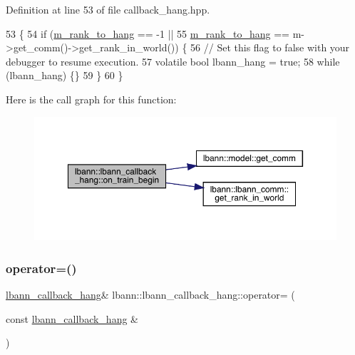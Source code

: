 Definition at line 53 of file callback\+\_\+hang.\+hpp.


\begin{DoxyCode}
53                                          \{
54     \textcolor{keywordflow}{if} (\hyperlink{classlbann_1_1lbann__callback__hang_a6dbd84f40c31b3b1ec3247c8da08a954}{m\_rank\_to\_hang} == -1 ||
55         \hyperlink{classlbann_1_1lbann__callback__hang_a6dbd84f40c31b3b1ec3247c8da08a954}{m\_rank\_to\_hang} == m->get\_comm()->get\_rank\_in\_world()) \{
56       \textcolor{comment}{// Set this flag to false with your debugger to resume execution.}
57       \textcolor{keyword}{volatile} \textcolor{keywordtype}{bool} lbann\_hang = \textcolor{keyword}{true};
58       \textcolor{keywordflow}{while} (lbann\_hang) \{\}
59     \}
60   \}
\end{DoxyCode}
Here is the call graph for this function\+:\nopagebreak
\begin{figure}[H]
\begin{center}
\leavevmode
\includegraphics[width=350pt]{classlbann_1_1lbann__callback__hang_ada39fd10375143a26c99e0a32d4368ce_cgraph}
\end{center}
\end{figure}
\mbox{\label{classlbann_1_1lbann__callback__hang_aef5c147b4f6cf94492564238d049f34d}} 
\subsubsection{\texorpdfstring{operator=()}{operator=()}}
{\footnotesize\ttfamily \hyperlink{classlbann_1_1lbann__callback__hang}{lbann\+\_\+callback\+\_\+hang}\& lbann\+::lbann\+\_\+callback\+\_\+hang\+::operator= (\begin{DoxyParamCaption}\item[{const \hyperlink{classlbann_1_1lbann__callback__hang}{lbann\+\_\+callback\+\_\+hang} \&}]{ }\end{DoxyParamCaption})\hspace{0.3cm}{\ttfamily [default]}}

